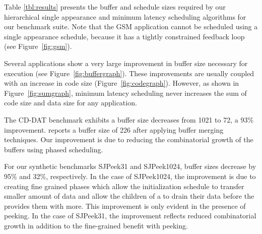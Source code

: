 \begin{comment}
\begin{figure}
\centering \psfig{figure=kz-1.eps,width=6in} \caption[Buffer
storage space savings of Phased Minimal Latency schedule vs.
Hierarchical schedule.]{Buffer storage space savings of Phased
Minimal Latency schedule vs. Hierarchical schedule. All data in
all {\Channels} is assume to consume same amount of space.}
\end{figure}

\begin{figure}
\centering \psfig{figure=kz-2.eps,width=6in} \caption[Storage
usage comparison]{Storage usage for compressed Minimal Latency
Phased schedule vs. Hierarchical schedule. Left bars are for
Hierarchical schedules. Numbers are normalized to total storage
required by Hierarchical schedule. Each entry in every schedule
and data items in all {\Channels} are assumed to consume same
amount of space.}
\end{figure}
\end{comment}

Table \ref{tbl:results} presents the buffer and schedule sizes
required by our hierarchical single appearance and minimum latency
scheduling algorithms for our benchmark suite.  Note that the GSM
application cannot be scheduled using a single appearance schedule,
because it has a tightly constrained feedback loop (see
Figure~\ref{fig:gsm}).

Several applications show a very large improvement in buffer size
necessary for execution (see Figure~\ref{fig:buffergraph}).  These
improvements are usually coupled with an increase in code size
(Figure~\ref{fig:codegraph}).  However, as shown in
Figure~\ref{fig:sumgraph}, minimum latency scheduling never increases
the sum of code size and data size for any application.

The CD-DAT benchmark exhibits a buffer size decreases from 1021 to 72,
a 93\% improvement. \cite{murthy99buffer} reports a buffer size of 226
after applying buffer merging techniques. Our improvement is due to
reducing the combinatorial growth of the buffers using phased
scheduling.  

For our synthetic benchmarks SJPeek31 and SJPeek1024, buffer sizes
decrease by 95\% and 32\%, respectively. In the case of SJPeek1024,
the improvement is due to creating fine grained phases which allow the
initialization schedule to transfer smaller amount of data and allow
the children of a {\splitjoin} to drain their data before the
{\splitter} provides them with more. This improvement is only evident
in the presence of peeking. In the case of SJPeek31, the improvement
reflects reduced combinatorial growth in addition to the fine-grained
benefit with peeking.

